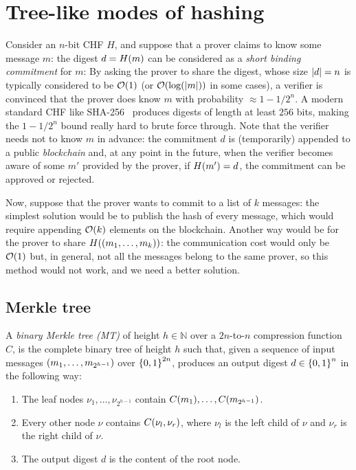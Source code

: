\section{Tree-like modes of hashing}\label{sec:tree_hash}
Consider an \(n\)-bit CHF \(H\), and suppose that a prover claims to know some message \(m\): 
the digest \(d = \call{H}{m}\) can be considered as a \emph{short binding commitment} for \(m\): 
By asking the prover to share the digest, whose size \(\left\lvert d\right\rvert = n\) is typically considered to be 
\(\BigO{1}\) (or \(\BigO{\call{\log}{\abs{m}}}\) in some cases), a verifier is convinced that the 
prover does know \(m\) with probability \(\approx 1 - {1}/{2^n}\).
A modern standard CHF like SHA-256~\cite{Dang2015} produces digests of length at least \(256\) bits,
making the \(1 - {1}/{2^n}\) bound really hard to brute force through.
Note that the verifier needs not to know \(m\) in advance: the commitment \(d\) is (temporarily) 
appended to a public \emph{blockchain} and, at any point in the future, when the verifier becomes 
aware of some \(m'\) provided by the prover, if \(\call{H}{m'} = d\), the commitment can be 
approved or rejected.

Now, suppose that the prover wants to commit to a list of \(k\) messages: the simplest solution 
would be to publish the hash of every message, which would require appending \(\BigO{k}\) 
elements on the blockchain.
Another way would be for the prover to share \(\call{H}{\Tuple{m_1, \dots, m_k}}\): the 
communication cost would only be \(\BigO{1}\) but, in general, not all the messages belong to the 
same prover, so this method would not work, and we need a better solution.

\subsection{Merkle tree}
\begin{definition}
	A \emph{binary Merkle tree (MT)} of height \(h \in \mathbb{N}\) over a \(2n\)-to-\(n\) compression 
	function \(C\), is the complete binary tree of height \(h\) such that, given a sequence of input 
	messages \(\left(m_1, \dots, m_{2^{h-1}}\right)\) over \(\left\{0, 1\right\}^{2n}\), produces an
	output digest \(d \in \left\{0, 1\right\}^{n}\) in the following way:
	\begin{enumerate}
		\item The leaf nodes \(\nu_1, \dots, \nu_{2^{h-1}}\) contain 
					\(\call{C}{m_1}, \dots, \call{C}{m_{2^{h-1}}}\).
		\item Every other node \(\nu \) contains \(\call{C}{\nu_l, \nu_r}\), where \(\nu_l\) is
		      the left child of \(\nu \) and \(\nu_r\) is the right child of \(\nu \).
		\item The output digest \(d\) is the content of the root node. 
	\end{enumerate}
\end{definition}

